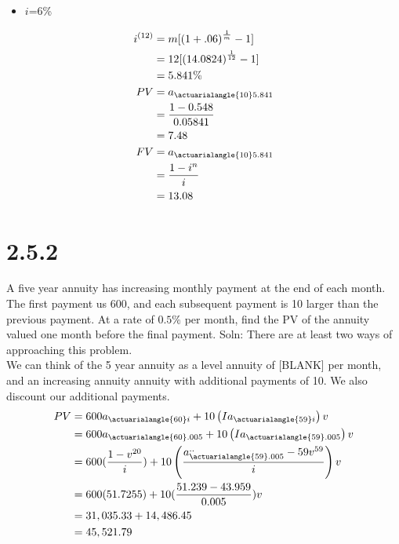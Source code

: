 \documentclass[12pt]{article}
\begin{document}
\begin{itemize}
	\item $i$=6\%\\
\end{itemize}
$$
\begin{aligned}
	i^{(12)} &= m[\left(1+.06 \right)^{\frac{1}{m}} -1]\\
		 &= 12[\left(14.0824 \right)^{\frac{1}{12}} -1 ]\\
		 &= 5.841\%\\
	PV &= a_{\actuarialangle{10}5.841}\\
	   &= \frac{1-0.548}{0.05841}\\
	   &= 7.48\\
	FV &= a_{\actuarialangle{10}5.841}\\
	   &= \frac{1-i^n}{i}\\
	   &= 13.08\\
\end{aligned}
$$

\section{2.5.2} 
A five year annuity has increasing monthly payment at the end of each month. The first payment
us 600, and each subsequent payment is 10 larger than the previous payment. At a rate of 
$0.5\%$ per month, find the PV of the annuity valued one month before the final payment.                                                                                                                                                                                  
Soln: There are at least two ways of approaching this problem. \\                                                                                                                                                                                                         

We can think of the 5 year annuity as a level annuity of [BLANK] per month,
and an increasing annuity annuity with additional payments of 10. We also
discount our additional payments.
$$                                                                                                                                   
\begin{aligned}
	PV &= 600a_{\actuarialangle{60}i} + 10 \left(Ia_{\actuarialangle{59}i}\right)v\\
	   &= 600a_{\actuarialangle{60}.005} + 10 \left(Ia_{\actuarialangle{59}.005}\right)v\\
	   &= 600(\frac{1-v^{20}}{i}) + 10 \left(\frac{a^{..}_{\actuarialangle{59}.005}-59v^{59}}{i}\right)v\\
	   &= 600 (51.7255) + 10(\frac{51.239-43.959}{0.005})v\\
	   &= 31,035.33+14,486.45\\
	   &= 45,521.79\\
\end{aligned}
$$                                                                                                                           
\pagebreak
\end{document}
